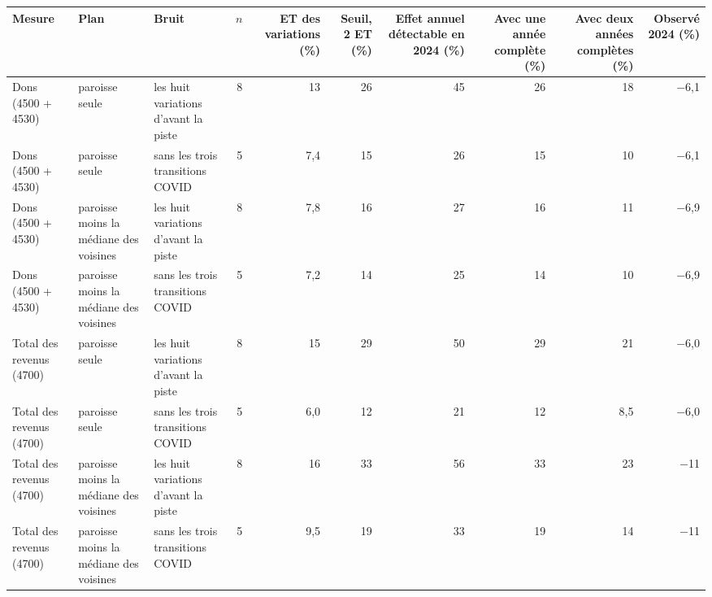 \begin{tabular}{@{}lllrrrrrrr@{}}\toprule
Mesure & Plan & Bruit & $n$ & ET des variations (\%) & Seuil, 2 ET (\%) & Effet annuel détectable en 2024 (\%) & Avec une année complète (\%) & Avec deux années complètes (\%) & Observé 2024 (\%) \\\midrule
Dons (4500 + 4530) & paroisse seule & les huit variations d'avant la piste & 8 & 13 & 26 & 45 & 26 & 18 & $-$6,1 \\
Dons (4500 + 4530) & paroisse seule & sans les trois transitions COVID & 5 & 7,4 & 15 & 26 & 15 & 10 & $-$6,1 \\
Dons (4500 + 4530) & paroisse moins la médiane des voisines & les huit variations d'avant la piste & 8 & 7,8 & 16 & 27 & 16 & 11 & $-$6,9 \\
Dons (4500 + 4530) & paroisse moins la médiane des voisines & sans les trois transitions COVID & 5 & 7,2 & 14 & 25 & 14 & 10 & $-$6,9 \\
Total des revenus (4700) & paroisse seule & les huit variations d'avant la piste & 8 & 15 & 29 & 50 & 29 & 21 & $-$6,0 \\
Total des revenus (4700) & paroisse seule & sans les trois transitions COVID & 5 & 6,0 & 12 & 21 & 12 & 8,5 & $-$6,0 \\
Total des revenus (4700) & paroisse moins la médiane des voisines & les huit variations d'avant la piste & 8 & 16 & 33 & 56 & 33 & 23 & $-$11 \\
Total des revenus (4700) & paroisse moins la médiane des voisines & sans les trois transitions COVID & 5 & 9,5 & 19 & 33 & 19 & 14 & $-$11 \\
\bottomrule\end{tabular}
